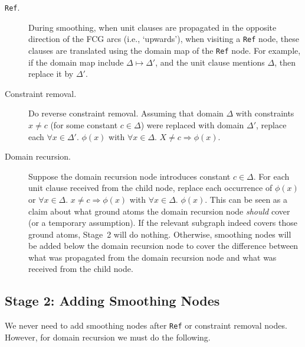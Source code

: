 \documentclass{article}
\theoremstyle{definition}
\begin{document}
\begin{description}
  \item[\texttt{Ref}.] During smoothing, when unit clauses are propagated in the
        opposite direction of the FCG arcs (i.e., `upwards'), when visiting a
        \texttt{Ref} node, these clauses are translated using the domain map of
        the \texttt{Ref} node. For example, if the domain map include
        $\Delta \mapsto \Delta'$, and the unit clause mentions $\Delta$, then
        replace it by $\Delta'$.
  \item[Constraint removal.] Do reverse constraint removal. Assuming that
        domain $\Delta$ with constraints $x \ne c$ (for some constant
        $c \in \Delta$) were replaced with domain $\Delta'$, replace each
        $\forall x \in \Delta'\text{. }\phi(x)$ with
        $\forall x \in \Delta\text{. }X \ne c \Rightarrow \phi(x)$.
  \item[Domain recursion.] Suppose the domain recursion node introduces constant
        $c \in \Delta$. For each unit clause received from the child node,
        replace each occurrence of $\phi(x)$ or $\forall x \in \Delta\text{.
        } x \ne c \Rightarrow \phi(x)$ with $\forall x \in \Delta\text{.
        }\phi(x)$. This can be seen as a claim about what ground atoms the
        domain recursion node \emph{should} cover (or a temporary assumption).
        If the relevant subgraph indeed covers those ground atoms, Stage~2 will
        do nothing. Otherwise, smoothing nodes will be added below the domain
        recursion node to cover the difference between what was propagated from
        the domain recursion node and what was received from the child node.
\end{description}

\subsection{Stage 2: Adding Smoothing Nodes}

We never need to add smoothing nodes after \texttt{Ref} or constraint removal
nodes. However, for domain recursion we must do the following.
\end{document}
